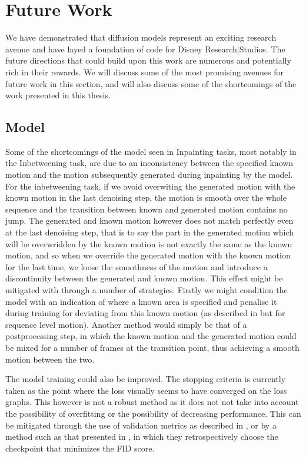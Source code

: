 \section{Future Work}
\label{sec:future_work}

We have demonstrated that diffusion models represent an exciting research avenue and have layed a foundation of code for Disney Research|Studios. The future directions that could build upon this work are numerous and potentially rich in their rewards. We will discuss some of the most promising avenues for future work in this section, and will also discuss some of the shortcomings of the work presented in this thesis.

\subsection{Model}
Some of the shortcomings of the model seen in Inpainting tasks, most notably in the Inbetweening task, are due to an inconsistency between the specified known motion and the motion subsequently generated during inpainting by the model. For the inbetweening task, if we avoid overwiting the generated motion with the known motion in the last denoising step, the motion is smooth over the whole sequence and the transition between known and generated motion contains no jump. The generated and known motion however does not match perfectly even at the last denoising step, that is to say the part in the generated motion which will be overwridden by the known motion is not exactly the same as the known motion, and so when we override the generated motion with the known motion for the last time, we loose the smoothness of the motion and introduce a discontinuity between the generated and known motion. This effect might be mitigated with through a number of strategies. Firstly we might condition the model with an indication of where a known area is specified and penalise it during training for deviating from this known motion (as described in  but for sequence level motion). Another method would simply be that of a postprocessing step, in which the known motion and the generated motion could be mixed for a number of frames at the transition point, thus achieving a smooth motion between the two.

The model training could also be improved. The stopping criteria is currently taken as the point where the loss visually seems to have converged on the loss graphs. This however is not a robust method as it does not not take into account the possibility of overfitting or the possibility of decreasing performance. This can be mitigated through the use of validation metrics as described in , or by a method such as that presented in \cite{MDM}, in which they retrospectively choose the checkpoint that minimizes the FID score.


